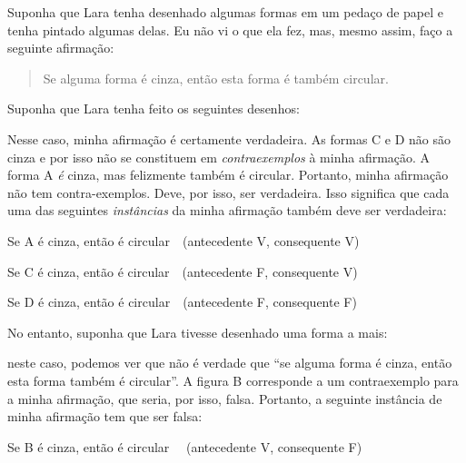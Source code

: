 Suponha que Lara tenha desenhado algumas formas em um pedaço de papel e tenha pintado algumas delas.
Eu não vi o que ela fez, mas, mesmo assim, faço a seguinte afirmação:
	\begin{quote}
		Se alguma forma é cinza, então esta forma é também circular.
	\end{quote}
Suponha que Lara tenha feito os seguintes desenhos:
\begin{center}
\end{center}
Nesse caso, minha afirmação é certamente verdadeira.
As formas C e D não são cinza e por isso não se constituem em \emph{contraexemplos} à minha afirmação.
A forma A \emph{é} cinza, mas felizmente também é circular.
Portanto, minha afirmação não tem contra-exemplos.
Deve, por isso, ser verdadeira.
Isso significa que cada uma das seguintes \emph{instâncias} da minha afirmação também deve ser verdadeira:
{\small 
	\begin{ebullet}
		\item Se A é cinza, então é circular\ \ \hfill (antecedente V, consequente V)
		\item Se C é cinza, então é circular\ \ \hfill (antecedente F, consequente V)
		\item Se D é cinza, então é circular\  \ \hfill (antecedente F, consequente F)
	\end{ebullet}}
No entanto, suponha que Lara tivesse desenhado uma forma a mais:
\begin{center}
\end{center}
neste caso, podemos ver que não é verdade que ``se alguma forma é cinza, então esta forma também é circular''.
A figura B corresponde a um contraexemplo para a minha afirmação, que seria, por isso, falsa.
Portanto, a seguinte instância de minha afirmação tem que ser  falsa:
{\small
	\begin{ebullet}
		\item Se B é cinza, então é circular \ \ \hfill (antecedente V, consequente F)
	\end{ebullet}}
